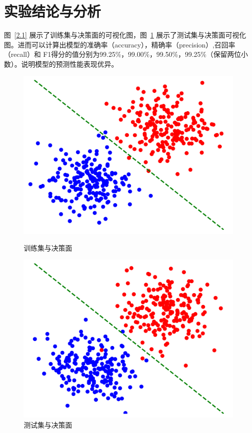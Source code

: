 \documentclass[a4paper,12pt]{report}
\begin{document}
\section{实验结论与分析}
\par 图~\ref{2.1} 展示了训练集与决策面的可视化图，图~\ref{2.2} 展示了测试集与决策面可视化图。进而可以计算出模型的准确率（accuracy），精确率（precision）,召回率（recall）和 F1得分的值分别为99.25\%，99.00\%，99.50\%，99.25\%（保留两位小数）。说明模型的预测性能表现优异。
\begin{figure}[htbp]
    \centering
    \begin{minipage}{0.42\textwidth}
        \centering
        \includegraphics[width=\textwidth]{../datasets/exp2/output/train.png}
        \caption{训练集与决策面}
        \label{2.1}
    \end{minipage}
    \hfill
    \begin{minipage}{0.42\textwidth}
        \centering
        \includegraphics[width=\textwidth]{../datasets/exp2/output/test.png}
        \caption{测试集与决策面}
        \label{2.2}
    \end{minipage}
\end{figure}
\end{document}
